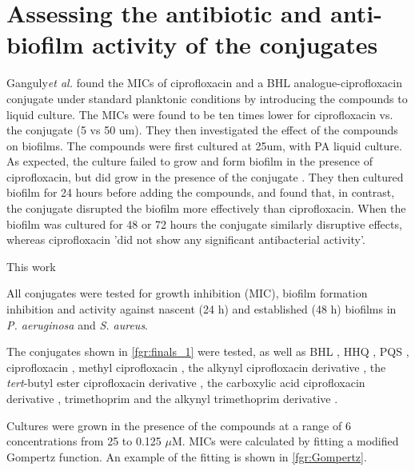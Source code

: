 \newpage

\section{Assessing the antibiotic and anti-biofilm activity of the conjugates}

Ganguly\textit{et al.} \cite{Ganguly2011} found the MICs of ciprofloxacin and a BHL analogue-ciprofloxacin conjugate  under standard planktonic conditions by introducing the compounds to liquid culture. The MICs were found to be ten times lower for ciprofloxacin vs. the conjugate  (5 vs 50 um). They then investigated the effect of the compounds on biofilms. The compounds were first cultured at 25um, with PA liquid culture. As expected, the culture failed to grow and form biofilm in the presence of ciprofloxacin, but did grow in the presence of the conjugate . They then cultured biofilm for 24 hours before adding the compounds, and found that, in contrast, the conjugate  disrupted the biofilm more effectively than ciprofloxacin. When the biofilm was cultured for 48 or 72 hours the conjugate similarly disruptive effects, whereas ciprofloxacin 'did not show any significant antibacterial activity'.

This work 

All conjugates were tested for growth inhibition (MIC), biofilm formation inhibition and activity against nascent (24 h) and established (48 h) biofilms in \textit{P. aeruginosa} and \textit{S. aureus}.

The conjugates shown in \ref{fgr:finals_1} were tested, as well as BHL , HHQ , PQS , ciprofloxacin , methyl ciprofloxacin , the alkynyl ciprofloxacin derivative , the \textit{tert}-butyl ester ciprofloxacin derivative , the carboxylic acid ciprofloxacin derivative , trimethoprim  and the alkynyl trimethoprim derivative .

Cultures were grown in the presence of the compounds at a range of 6 concentrations from 25 to 0.125 $\mu$M. MICs were calculated by fitting a modified Gompertz function\cite{Lambert2016}. An example of the fitting is shown in \ref{fgr:Gompertz}. 

